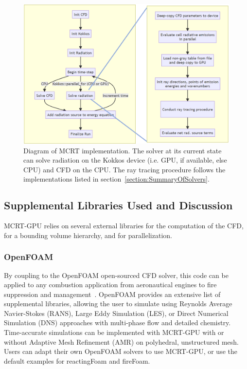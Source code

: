 \begin{figure}
  \centering
  \includegraphics[width=01.0\linewidth]{figures/ch3/joint_flow_chart.png}
  \caption{Diagram of MCRT implementation. The solver at its current state can solve radiation on the Kokkos device (i.e. GPU, if available, else CPU) and CFD on the CPU. The ray tracing procedure follows the implementations listed in section~\ref{section:SummaryOfSolvers}.}
  \label{fig:joint_flow_chart}
\end{figure}

\subsection{Supplemental Libraries Used and Discussion}\label{section:SupplementalLibraries}
MCRT-GPU relies on several external libraries for the computation of the CFD, for a bounding volume hierarchy, and for parallelization.

\subsubsection{OpenFOAM}
By coupling to the OpenFOAM open-sourced CFD solver, this code can be applied to any combustion application from aeronautical engines to fire suppression and management~\cite{Weller1998ATechniques}. OpenFOAM provides an extensive list of supplemental libraries, allowing the user to simulate using Reynolds Average Navier-Stokes (RANS), Large Eddy Simulation (LES), or Direct Numerical Simulation (DNS) approaches with multi-phase flow and detailed chemistry. 
Time-accurate simulations can be implemented with MCRT-GPU with or without Adaptive Mesh Refinement (AMR) on polyhedral, unstructured mesh.
Users can adapt their own OpenFOAM solvers to use MCRT-GPU, or use the default examples for reactingFoam and fireFoam.

